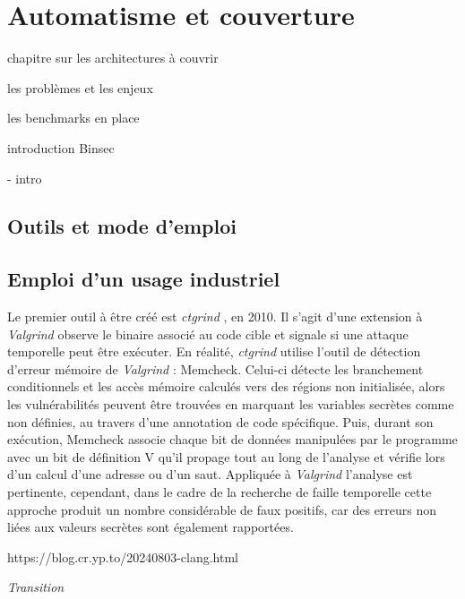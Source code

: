 \chapter{Automatisme et couverture}
\label{chap:automateVerifAutomatisme}

chapitre sur les architectures à couvrir 

les problèmes et les enjeux

les benchmarks en place

introduction Binsec


- intro


\section{Outils et mode d'emploi}


\section{Emploi d'un usage industriel}

Le premier outil à être créé est \textit{ctgrind} \cite{ctgrind}, en 2010. Il s'agit d'une extension à \textit{Valgrind} observe le binaire associé au code cible et signale si une attaque temporelle peut être exécuter. En réalité, \textit{ctgrind} utilise l'outil de détection d'erreur mémoire de \textit{Valgrind} : Memcheck. Celui-ci détecte les branchement conditionnels et les accès mémoire calculés vers des régions non initialisée, alors les vulnérabilités peuvent être trouvées en marquant les variables secrètes comme non définies, au travers d'une annotation de code spécifique. Puis, durant son exécution, Memcheck associe chaque bit de données manipulées par le programme avec un bit de définition V qu'il propage tout au long de l'analyse et vérifie lors d'un calcul d'une adresse ou d'un saut. Appliquée à \textit{Valgrind} l'analyse est pertinente, cependant, dans le cadre de la recherche de faille temporelle cette approche produit un nombre considérable de faux positifs, car des erreurs non liées aux valeurs secrètes sont également rapportées.\medbreak




https://blog.cr.yp.to/20240803-clang.html






\vfill
\textit{Transition}